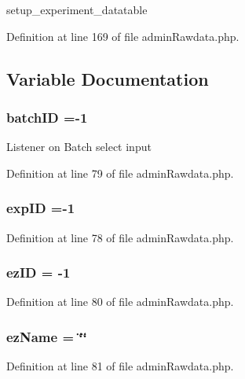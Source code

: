 setup\-\_\-experiment\-\_\-datatable 

Definition at line 169 of file admin\-Rawdata.\-php.



\subsection{Variable Documentation}
\hypertarget{admin_rawdata_8php_a88c5bc4262b7c34f236357f5c53fc99b}{
\subsubsection[{batch\-I\-D}]{\setlength{\rightskip}{0pt plus 5cm}batch\-I\-D =-\/1}}\label{admin_rawdata_8php_a88c5bc4262b7c34f236357f5c53fc99b}
Listener on Batch select input 

Definition at line 79 of file admin\-Rawdata.\-php.

\hypertarget{admin_rawdata_8php_a888d53a6517f4272b5982c3ca9d16e8a}{
\subsubsection[{exp\-I\-D}]{\setlength{\rightskip}{0pt plus 5cm}exp\-I\-D =-\/1}}\label{admin_rawdata_8php_a888d53a6517f4272b5982c3ca9d16e8a}


Definition at line 78 of file admin\-Rawdata.\-php.

\hypertarget{admin_rawdata_8php_adf465cadf95987152966d26567509f92}{
\subsubsection[{ez\-I\-D}]{\setlength{\rightskip}{0pt plus 5cm}ez\-I\-D = -\/1}}\label{admin_rawdata_8php_adf465cadf95987152966d26567509f92}


Definition at line 80 of file admin\-Rawdata.\-php.

\hypertarget{admin_rawdata_8php_a052a753c7ee63d24285f81cefddb7d34}{
\subsubsection[{ez\-Name}]{\setlength{\rightskip}{0pt plus 5cm}ez\-Name = \char`\"{}\char`\"{}}}\label{admin_rawdata_8php_a052a753c7ee63d24285f81cefddb7d34}


Definition at line 81 of file admin\-Rawdata.\-php.

